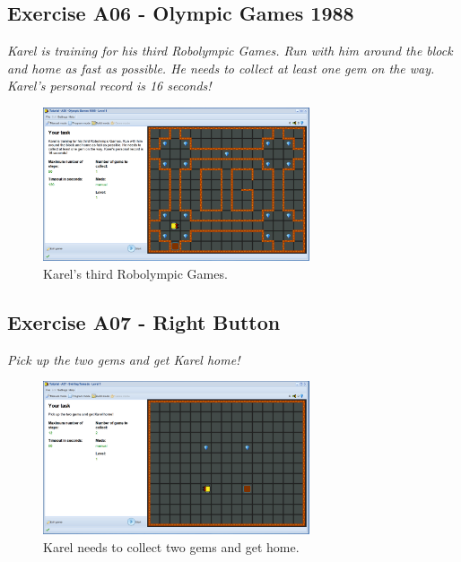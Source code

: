 \documentclass[article,A4,12pt]{llncs}
\begin{document}
\subsection{Exercise A06 - Olympic Games 1988 }

{\em Karel is training for his third Robolympic Games. Run with him around the block and home as fast as possible. He needs to collect at least one gem on the way. Karel's personal record is 16 seconds!}

\begin{figure}[!ht]
\begin{center}
\includegraphics[width=0.7\textwidth]{img/a06.png}
\end{center}
\vspace{-4mm}
\caption{Karel's third Robolympic Games.}
\label{fig:a06}
\vspace{-1cm}
\end{figure}
\noindent

\newpage

\subsection{Exercise A07 - Right Button}

{\em Pick up the two gems and get Karel home!}

\begin{figure}[!ht]
\begin{center}
\includegraphics[width=0.7\textwidth]{img/a07.png}
\end{center}
\vspace{-4mm}
\caption{Karel needs to collect two gems and get home.}
\label{fig:a07}
\vspace{-1cm}
\end{figure}
\noindent
\end{document}
